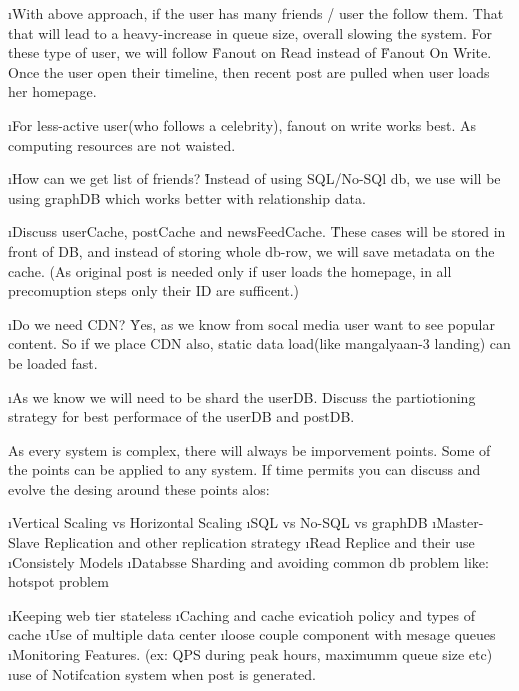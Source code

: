     \i With above approach, if the user has many friends / user the follow them. That that will lead to a heavy-increase in queue size, overall slowing the system. For these type of user, we will follow \u{Fanout on Read} instead of \u{Fanout On Write}. Once the user open their timeline, then recent post are pulled when user loads her homepage.

    \i For less-active user(who follows a celebrity), fanout on write works best. As computing resources are not waisted.

    \i How can we get list of friends?
    \r Instead of using SQL/No-SQl db, we use will be using \b{graphDB}  which works better with relationship data.

    \i Discuss userCache, postCache and newsFeedCache.
    \r These cases will be stored in front of DB, and instead of storing whole db-row, we will save metadata on the cache. (As original post is needed only if user loads the homepage, in all precomuption steps only their ID are sufficent.)

    \i Do we need CDN?
    \r Yes, as we know from socal media user want to see popular content. So if we place CDN also, static data load(like mangalyaan-3 landing) can be loaded fast.

    \i As we know we will need to be shard the userDB. Discuss the partiotioning strategy for best performace of the userDB and postDB.
\lend

As every system is complex, there will always be imporvement points. Some of the points can be applied to any system.
If time permits you can discuss and evolve the desing around these points alos:\

\ls
    \i Vertical Scaling vs Horizontal Scaling
    \i SQL  vs No-SQL vs graphDB
    \i Master-Slave Replication and other replication strategy
    \i Read Replice and their use
    \i Consistely Models
    \i Databsse Sharding and avoiding common db problem like: hotspot problem
\le

\ls
    \i Keeping web tier stateless
    \i Caching and cache evicatioh policy and types of cache
    \i Use of multiple data center
    \i loose couple component with mesage queues
    \i Monitoring Features. (ex: QPS during peak hours, maximumm queue size etc)
    \i use of Notifcation system when post is generated.
\le
